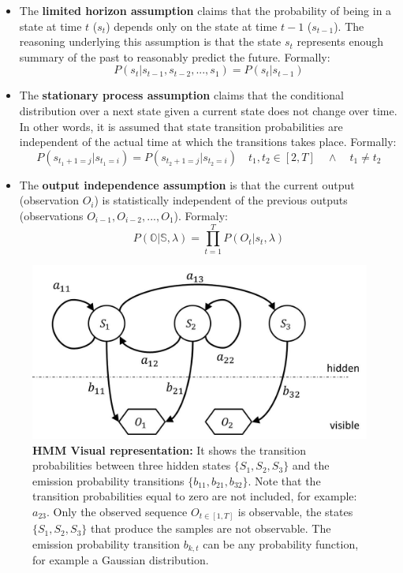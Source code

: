 \begin{itemize}
\item The \textbf{limited horizon assumption} claims that the probability of being in a state at time $t$ ($s_t$) depends only on the state at time $t-1$ ($s_{t-1}$). The reasoning underlying this assumption is that the state $s_t$ represents enough summary of the past to reasonably predict the future. Formally: 
\begin{equation}
P(s_t|s_{t-1},s_{t-2},...,s_1) = P(s_t|s_{t-1})
\label{horizon_ass}
\end{equation}

\item The \textbf{stationary process assumption} claims that the conditional distribution over a next state given a current state does not change over time. In other words, it is assumed that state transition probabilities are independent of the actual time at which the transitions takes place. Formally: 
\begin{equation}
P(s_{t_1+1=j}|s_{t_1=i}) = P(s_{t_2+1=j}|s_{t_2=i}) \quad t_1,t_2 \in [2,T] \quad \wedge  \quad t_1 \neq t_2 
\label{stationary_ass}
\end{equation}

\item The \textbf{output independence assumption} is that the current output (observation $O_i$) is statistically independent of the previous outputs (observations $O_{i-1}, O_{i-2}, ..., O_{1} $). Formaly: 
\begin{equation}
P(\mathbb{O} |\mathbb{S}, \lambda) = \prod_{t=1}^{T} P(O_t|s_t,\lambda)
\label{independence_ass}
\end{equation}

\end{itemize}


\begin{figure}[h!]
  \vspace{0.5em} %
  \includegraphics[scale=0.6]{Figures/HMM_simple.jpg}
  \caption[description]{\textbf{HMM Visual representation:} It shows the transition probabilities between three hidden states $\{S_1, S_2, S_3 \}$ and the emission probability transitions $\{b_{11}, b_{21}, b_{32} \}$. Note that the transition probabilities equal to zero are not included, for example: $a_{23}$. Only the observed sequence $O_{t \in [1,T]}$ is observable, the states $\{S_1, S_2, S_3 \}$ that produce the samples are not observable. The emission probability transition $b_{k,t}$ can be any probability function, for example a Gaussian distribution.}
  \label{fig:HHM_MODEL}
\end{figure}


